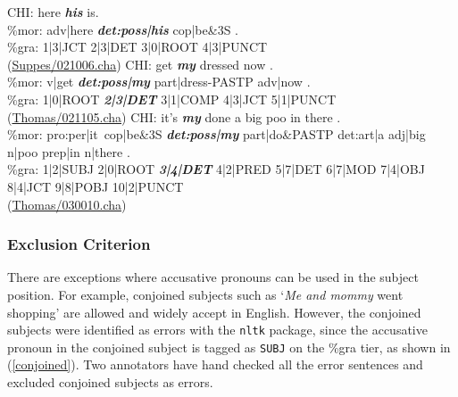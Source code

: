 \begin{exe}
\ex \label{his} \gll *CHI:	here \textit{\textbf{his}} is. \\
\%mor:	adv|here \textbf{\textit{det:poss|his}} cop|be&3S .\\
\%gra:	1|3|JCT 2|3|DET 3|0|ROOT 4|3|PUNCT\\
(\href{https://childes.talkbank.org/browser/index.php?url=Eng-NA/Suppes/021006.cha}{Suppes/021006.cha})
\ex \label{getdressed} \gll *CHI: get \textit{\textbf{my}} dressed now .\\
\%mor:	v|get \textit{\textbf{det:poss|my}} part|dress-PASTP adv|now .\\
\%gra:	1|0|ROOT \textit{\textbf{2|3|DET}} 3|1|COMP 4|3|JCT 5|1|PUNCT\\
(\href{https://childes.talkbank.org/browser/index.php?url=Eng-UK/Thomas/021105.cha}{Thomas/021105.cha})
\ex \label{bigpoop} \gll *CHI:	it's \textit{\textbf{my}} done a big poo in there . \\
\%mor:	pro:per|it~cop|be&3S \textit{\textbf{det:poss|my}} part|do&PASTP det:art|a adj|big n|poo prep|in n|there .\\
\%gra:	1|2|SUBJ 2|0|ROOT \textit{\textbf{3|4|DET}} 4|2|PRED 5|7|DET 6|7|MOD 7|4|OBJ 8|4|JCT	9|8|POBJ 10|2|PUNCT\\
(\href{https://childes.talkbank.org/browser/index.php?url=Eng-UK/Thomas/030010.cha}{Thomas/030010.cha})
\end{exe}


\subsubsection{Exclusion Criterion}
There are exceptions where accusative pronouns can be used in the subject position. For example, conjoined subjects such as `\textit{Me and mommy} went shopping' are allowed and widely accept in English. However, the conjoined subjects were identified as errors with the \texttt{nltk} package, since the accusative pronoun in the conjoined subject is tagged as \texttt{SUBJ} on the {\%gra} tier, as shown in (\ref{conjoined}). Two annotators have hand checked all the error sentences and excluded conjoined subjects as errors. 

